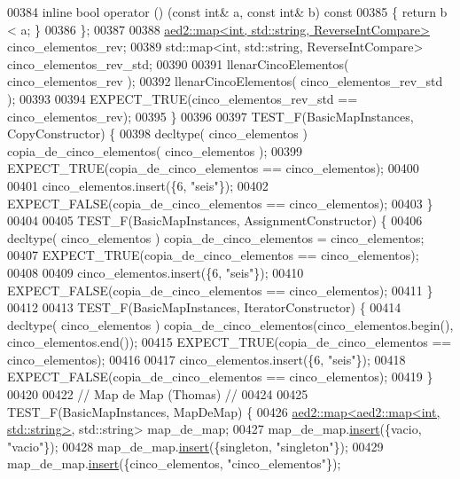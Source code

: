 \begin{DoxyCode}
00384         \textcolor{keyword}{inline} \textcolor{keywordtype}{bool} operator () (\textcolor{keyword}{const} \textcolor{keywordtype}{int}& a, \textcolor{keyword}{const} \textcolor{keywordtype}{int}& b)\textcolor{keyword}{ const}
00385 \textcolor{keyword}{        }\{ \textcolor{keywordflow}{return} b < a; \}
00386     \};
00387 
00388     \hyperlink{classaed2_1_1map}{aed2::map<int, std::string, ReverseIntCompare>} 
      cinco\_elementos\_rev;
00389     std::map<int, std::string, ReverseIntCompare> cinco\_elementos\_rev\_std;
00390 
00391     llenarCincoElementos( cinco\_elementos\_rev );
00392     llenarCincoElementos( cinco\_elementos\_rev\_std );
00393 
00394     EXPECT\_TRUE(cinco\_elementos\_rev\_std == cinco\_elementos\_rev);
00395 \}
00396 
00397 TEST\_F(BasicMapInstances, CopyConstructor) \{
00398     decltype( cinco\_elementos ) copia\_de\_cinco\_elementos( cinco\_elementos );
00399     EXPECT\_TRUE(copia\_de\_cinco\_elementos == cinco\_elementos);
00400 
00401     cinco\_elementos.insert(\{6, \textcolor{stringliteral}{"seis"}\});
00402     EXPECT\_FALSE(copia\_de\_cinco\_elementos == cinco\_elementos);
00403 \}
00404 
00405 TEST\_F(BasicMapInstances, AssignmentConstructor) \{
00406     decltype( cinco\_elementos ) copia\_de\_cinco\_elementos = cinco\_elementos;
00407     EXPECT\_TRUE(copia\_de\_cinco\_elementos == cinco\_elementos);
00408 
00409     cinco\_elementos.insert(\{6, \textcolor{stringliteral}{"seis"}\});
00410     EXPECT\_FALSE(copia\_de\_cinco\_elementos == cinco\_elementos);
00411 \}
00412 
00413 TEST\_F(BasicMapInstances, IteratorConstructor) \{
00414     decltype( cinco\_elementos ) copia\_de\_cinco\_elementos(cinco\_elementos.begin(), cinco\_elementos.end());
00415     EXPECT\_TRUE(copia\_de\_cinco\_elementos == cinco\_elementos);
00416 
00417     cinco\_elementos.insert(\{6, \textcolor{stringliteral}{"seis"}\});
00418     EXPECT\_FALSE(copia\_de\_cinco\_elementos == cinco\_elementos);
00419 \}
00420 
00422 \textcolor{comment}{// Map de Map (Thomas) //}
00424 \textcolor{comment}{}
00425 TEST\_F(BasicMapInstances, MapDeMap) \{
00426     \hyperlink{classaed2_1_1map}{aed2::map<aed2::map<int, std::string>}, std::string> map\_de\_map;
00427     map\_de\_map.\hyperlink{classaed2_1_1map_a60aacba06b1579630b3c8e996cf248c8_a60aacba06b1579630b3c8e996cf248c8}{insert}(\{vacio, \textcolor{stringliteral}{"vacio"}\});
00428     map\_de\_map.\hyperlink{classaed2_1_1map_a60aacba06b1579630b3c8e996cf248c8_a60aacba06b1579630b3c8e996cf248c8}{insert}(\{singleton, \textcolor{stringliteral}{"singleton"}\});
00429     map\_de\_map.\hyperlink{classaed2_1_1map_a60aacba06b1579630b3c8e996cf248c8_a60aacba06b1579630b3c8e996cf248c8}{insert}(\{cinco\_elementos, \textcolor{stringliteral}{"cinco\_elementos"}\});

\end{DoxyCode}
